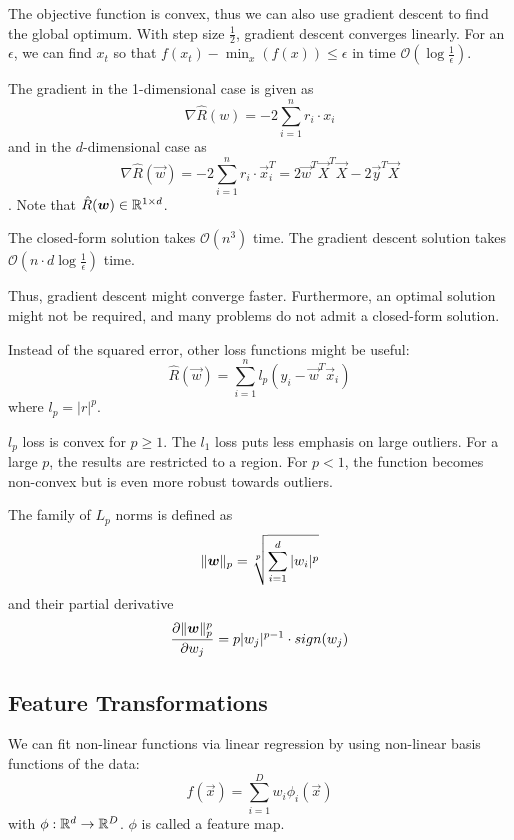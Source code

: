 The objective function is convex, thus we can also use gradient
descent to find the global optimum.
With step size $\frac{1}{2}$,
gradient descent converges linearly.
For an $\epsilon$, we can find $x_t$ so that
$f(x_t) - \min_x(f(x)) \leq \epsilon$ in time
$\mathcal{O}(\log \frac{1}{\epsilon})$.

The gradient in the 1-dimensional case is given as
\begin{equation*}
    \nabla \hat{R}(w)
    = -2 \sum_{i = 1}^n{r_i \cdot x_i}
\end{equation*}
and in the $d$-dimensional case as
\begin{equation*}
    \nabla \hat{R}(\vec{w})
    = -2 \sum_{i = 1}^n{r_i \cdot \vec{x}_i^T}
    = 2 \vec{w}^T \vec{X}^T \vec{X} - 2 \vec{y}^T \vec{X}
\end{equation*}.
Note that $\hat{R}(\boldsymbol{w}) \in \mathbb{R}^{1 \times d}$.

The closed-form solution takes $\mathcal{O}(n^3)$ time.
The gradient descent solution takes
$\mathcal{O}(n \cdot d \log \frac{1}{\epsilon})$ time.

Thus, gradient descent might converge faster.
Furthermore, an optimal solution might not be required,
and many problems do not admit a closed-form solution.

Instead of the squared error, other loss functions might be useful:
\begin{equation*}
    \hat{R}(\vec{w}) = \sum_{i = 1}^n{l_p(y_i - \vec{w}^T \vec{x}_i)}
\end{equation*}
where $l_p = |r|^p$.

$l_p$ loss is convex for $p \geq 1$.
The $l_1$ loss puts less emphasis on large outliers.
For a large $p$, the results are restricted to a region.
For $p < 1$, the function becomes non-convex but is even more
robust towards outliers.

The family of $L_p$ norms is defined as
\begin{equation*}
    \lVert\boldsymbol{w}\rVert_p =
    \sqrt[p]{\sum_{i=1}^d{|w_i|^p}}
\end{equation*}
and their partial derivative
\begin{equation*}
    \frac{\partial \lVert\boldsymbol{w}\rVert_p^p}{\partial w_j}
    = p |w_j|^{p-1} \cdot sign(w_j)
\end{equation*}


\subsection{Feature Transformations}
We can fit non-linear functions via linear regression
by using non-linear basis functions of the data:
\begin{equation*}
    f(\vec{x}) = \sum_{i=1}^D{w_i \phi_i(\vec{x})}
\end{equation*}
with $\phi : \mathbb{R}^d \to \mathbb{R}^D$.
$\phi$ is called a feature map.

